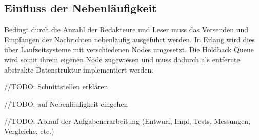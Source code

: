 \subsection{Einfluss der Nebenläufigkeit}

Bedingt durch die Anzahl der Redakteure und Leser muss das Versenden und Empfangen der Nachrichten nebenläufig ausgeführt werden. In Erlang wird dies über Laufzeitsysteme mit verschiedenen Nodes umgesetzt. Die Holdback Queue wird somit ihrem eigenen Node zugewiesen und muss dadurch als entfernte abstrakte Datenstruktur implementiert werden. 

//TODO: Schnittstellen erklären

//TODO: auf Nebenläufigkeit eingehen

//TODO: Ablauf der Aufgabenerarbeitung (Entwurf, Impl, Tests, Messungen, Vergleiche, etc.)


